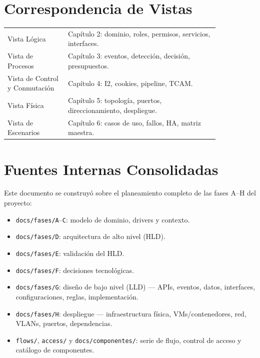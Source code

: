 \documentclass[11pt,a4paper]{report}
\begin{document}
\section{Correspondencia de Vistas}
\begin{longtable}{p{0.24\linewidth}p{0.6\linewidth}}
\toprule
Vista Lógica & Capítulo 2: dominio, roles, permisos, servicios, interfaces. \\
Vista de Procesos & Capítulo 3: eventos, detección, decisión, presupuestos. \\
Vista de Control y Conmutación & Capítulo 4: I2, cookies, pipeline, TCAM. \\
Vista Física & Capítulo 5: topología, puertos, direccionamiento, despliegue. \\
Vista de Escenarios & Capítulo 6: casos de uso, fallos, HA, matriz maestra. \\
\bottomrule
\end{longtable}

\section{Fuentes Internas Consolidadas}
Este documento se construyó sobre el planeamiento completo de las fases A--H del proyecto:
\begin{itemize}[leftmargin=*]
\item \texttt{docs/fases/A}--\texttt{C}: modelo de dominio, drivers y contexto.
\item \texttt{docs/fases/D}: arquitectura de alto nivel (HLD).
\item \texttt{docs/fases/E}: validación del HLD.
\item \texttt{docs/fases/F}: decisiones tecnológicas.
\item \texttt{docs/fases/G}: diseño de bajo nivel (LLD) --- APIs, eventos, datos, interfaces, configuraciones, reglas, implementación.
\item \texttt{docs/fases/H}: despliegue --- infraestructura física, VMs/contenedores, red, VLANs, puertos, dependencias.
\item \texttt{flows/}, \texttt{access/} y \texttt{docs/componentes/}: serie de flujo, control de acceso y catálogo de componentes.
\end{itemize}
\end{document}
